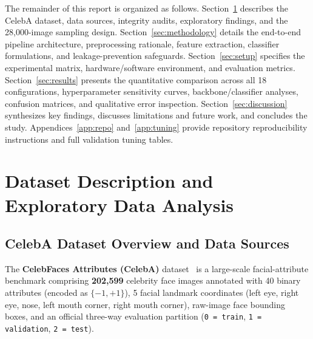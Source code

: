 \documentclass[12pt,a4paper]{article}
\newcommand{\code}[1]{\texttt{#1}}
\begin{document}
The remainder of this report is organized as follows. Section~\ref{sec:eda} describes the CelebA dataset, data sources, integrity audits, exploratory findings, and the 28,000-image sampling design. Section~\ref{sec:methodology} details the end-to-end pipeline architecture, preprocessing rationale, feature extraction, classifier formulations, and leakage-prevention safeguards. Section~\ref{sec:setup} specifies the experimental matrix, hardware/software environment, and evaluation metrics. Section~\ref{sec:results} presents the quantitative comparison across all 18 configurations, hyperparameter sensitivity curves, backbone/classifier analyses, confusion matrices, and qualitative error inspection. Section~\ref{sec:discussion} synthesizes key findings, discusses limitations and future work, and concludes the study. Appendices~\ref{app:repo} and~\ref{app:tuning} provide repository reproducibility instructions and full validation tuning tables.

\section{Dataset Description and Exploratory Data Analysis}
\label{sec:eda}

\subsection{CelebA Dataset Overview and Data Sources}
\label{subsec:dataset_overview}

The \textbf{CelebFaces Attributes (CelebA)} dataset~\cite{liu2015celeba} is a large-scale facial-attribute benchmark comprising \textbf{202,599} celebrity face images annotated with 40 binary attributes (encoded as $\{-1, +1\}$), 5 facial landmark coordinates (left eye, right eye, nose, left mouth corner, right mouth corner), raw-image face bounding boxes, and an official three-way evaluation partition (\code{0 = train}, \code{1 = validation}, \code{2 = test}).
\end{document}
